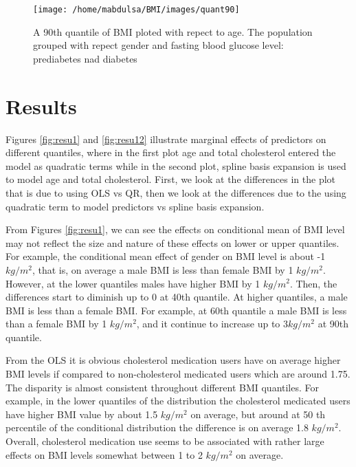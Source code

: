 \documentclass[
  12pt,
]{article}
\begin{document}
\begin{figure}

{\centering \texttt{[image: /home/mabdulsa/BMI/images/quant90]} 

}

\caption{A 90th quantile of BMI ploted with repect to age. The population grouped with repect gender and fasting blood glucose level: prediabetes nad diabetes}\label{fig:unnamed-chunk-1}
\end{figure}

\section{Results}

Figures \ref{fig:resu1} and \ref{fig:resu12} illustrate marginal effects of predictors on different quantiles, where in the first plot age and total cholesterol entered the model as quadratic terms while in the second plot, spline basis expansion is used to model age and total cholesterol. First, we look at the differences in the plot that is due to using OLS vs QR, then we look at the differences due to the using quadratic term to model predictors vs spline basis expansion.

From Figures \ref{fig:resu1}, we can see the effects on conditional mean of BMI level may not reflect the size and nature of these effects on lower or upper quantiles. For example, the conditional mean effect of gender on BMI level is about -1 \(kg/m^2\), that is, on average a male BMI is less than female BMI by 1 \(kg/m^2\). However, at the lower quantiles males have higher BMI by 1 \(kg/m^2\). Then, the differences start to diminish up to 0 at 40th quantile. At higher quantiles, a male BMI is less than a female BMI. For example, at 60th quantile a male BMI is less than a female BMI by 1 \(kg/m^2\), and it continue to increase up to 3\(kg/m^2\) at 90th quantile.

From the OLS it is obvious cholesterol medication users have on average higher BMI levels if compared to non-cholesterol medicated users which are around 1.75. The disparity is almost consistent throughout different BMI quantiles. For example, in the lower quantiles of the distribution the cholesterol medicated users have higher BMI value by about 1.5 \(kg/m^2\) on average, but around at 50 th percentile of the conditional distribution the difference is on average 1.8 \(kg/m^2\). Overall, cholesterol medication use seems to be associated with rather large effects on BMI levels somewhat between 1 to 2 \(kg/m^2\) on average.
\end{document}
